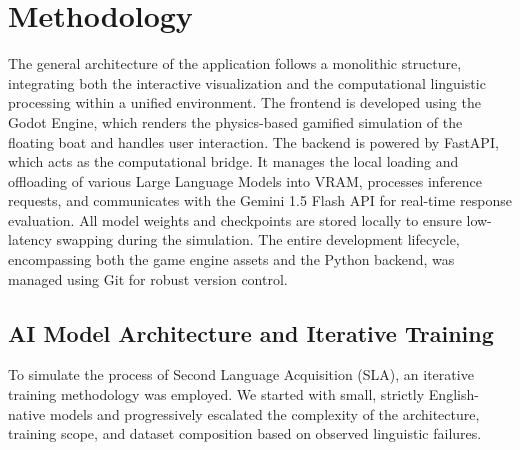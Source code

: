 \section{Methodology}
\label{sec:method}

The general architecture of the application follows a monolithic structure, integrating both the interactive visualization and the computational linguistic processing within a unified environment. The frontend is developed using the Godot Engine, which renders the physics-based gamified simulation of the floating boat and handles user interaction. The backend is powered by FastAPI, which acts as the computational bridge. It manages the local loading and offloading of various Large Language Models into VRAM, processes inference requests, and communicates with the Gemini 1.5 Flash API for real-time response evaluation. All model weights and checkpoints are stored locally to ensure low-latency swapping during the simulation. The entire development lifecycle, encompassing both the game engine assets and the Python backend, was managed using Git for robust version control.

\subsection{AI Model Architecture and Iterative Training}
\label{subsec:ai_model}

To simulate the process of Second Language Acquisition (SLA), an iterative training methodology was employed. We started with small, strictly English-native models and progressively escalated the complexity of the architecture, training scope, and dataset composition based on observed linguistic failures.

